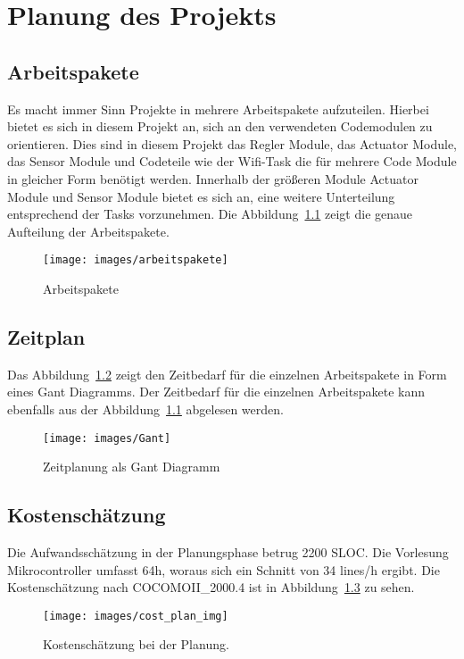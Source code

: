 \chapter{Planung des Projekts}
\label{cha:Planung}

\section{Arbeitspakete}

Es macht immer Sinn Projekte in mehrere Arbeitspakete aufzuteilen. Hierbei bietet es sich in diesem Projekt an, sich an den verwendeten Codemodulen zu orientieren. Dies sind in diesem Projekt das Regler Module, das Actuator Module, das Sensor Module und Codeteile wie der Wifi-Task die für mehrere Code Module in gleicher Form benötigt werden. Innerhalb der größeren Module Actuator Module und Sensor Module bietet es sich an, eine weitere Unterteilung entsprechend der Tasks vorzunehmen. Die Abbildung~\ref{fig:arbeitspakete} zeigt die genaue Aufteilung der Arbeitspakete.

\begin{figure}[hbt]
	\centering
	\texttt{[image: images/arbeitspakete]}
	\caption[Arbeitspakete]{Arbeitspakete}
	\label{fig:arbeitspakete}
\end{figure}

\section{Zeitplan}
Das Abbildung~\ref{fig:time_plan} zeigt den Zeitbedarf für die einzelnen Arbeitspakete in Form eines Gant Diagramms. Der Zeitbedarf für die einzelnen Arbeitspakete kann ebenfalls aus der Abbildung~\ref{fig:arbeitspakete} abgelesen werden.

\begin{figure}[hbt]
	\centering
	\texttt{[image: images/Gant]}
	\caption[Zeitplanung als Gant Diagramm]{Zeitplanung als Gant Diagramm}
	\label{fig:time_plan}
\end{figure}


\section{Kostenschätzung}
\label{cha:Planung_cost}
Die Aufwandsschätzung in der Planungsphase betrug 2200 SLOC. Die Vorlesung Mikrocontroller umfasst 64h, woraus sich ein Schnitt von 34 lines/h ergibt. Die Kostenschätzung nach COCOMOII\_2000.4 ist in Abbildung~\ref{fig:cost_plan} zu sehen.

\begin{figure}[hbt]
	\centering
	\texttt{[image: images/cost\_plan\_img]}
	\caption[Kostenschätzung Planung]{Kostenschätzung bei der Planung.}
	\label{fig:cost_plan}
\end{figure}